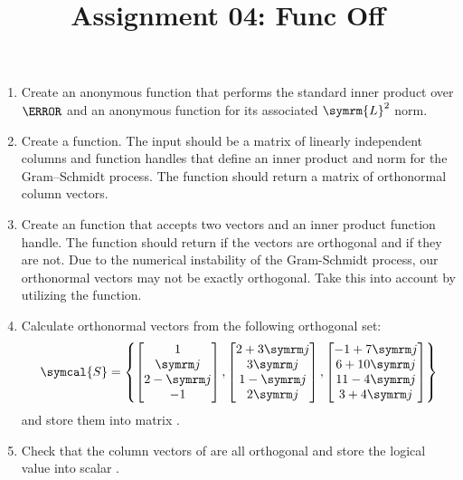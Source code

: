 \documentclass{article}
\title{Assignment 04: Func Off}
\begin{document}
\renderTitle

\begin{enumerate}[leftmargin=*]
	\item
		Create an  anonymous function that performs
		the standard inner product over \(\C\) and an
		 anonymous function for its associated
		\(\symrm{L}^2\) norm.

	\item
		Create a  function.  The input
		should be a matrix of linearly independent columns and
		function handles that define an inner product and norm
		for the Gram–Schmidt process.  The function should
		return a matrix of orthonormal column vectors.

	\item
		Create an  function that accepts
		two vectors and an inner product function handle.  The
		function should return  if the vectors
		are orthogonal and  if they are not.
		Due to the numerical instability of the Gram-Schmidt
		process, our orthonormal vectors may not be exactly
		orthogonal.  Take this into account by utilizing the
		 function.

	\item
		Calculate orthonormal vectors from the following
		orthogonal set:
		\begin{equation}
			\symcal{S}
			=
			\left\{
				\begin{bmatrix}
					1       \\
					\im     \\
					2 - \im \\
					-1      \\
				\end{bmatrix},
				\begin{bmatrix}
					2 + 3\im \\
					3\im     \\
					1 - \im  \\
					2\im     \\
				\end{bmatrix},
				\begin{bmatrix}
					-1 + 7\im \\
					6 + 10\im \\
					11 - 4\im \\
					3 + 4\im  \\
				\end{bmatrix}
			\right\}
		\end{equation}
		and store them into matrix .

	\item
		Check that the column vectors of  are all
		orthogonal and store the logical value into scalar
		.
\end{enumerate}
\end{document}
